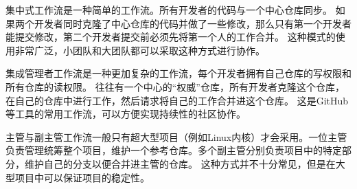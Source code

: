 \documentclass[../main.tex]{subfiles}
\begin{document}
集中式工作流是一种简单的工作流。所有开发者的代码与一个中心仓库同步。
如果两个开发者同时克隆了中心仓库的代码并做了一些修改，那么只有第一个开发者能提交修改，第二个开发者提交前必须先将第一个人的工作合并。
这种模式的使用非常广泛，小团队和大团队都可以采取这种方式进行协作。

集成管理者工作流是一种更加复杂的工作流，每个开发者拥有自己仓库的写权限和所有仓库的读权限。
往往有一个中心的“权威”仓库，所有开发者克隆这个仓库，在自己的仓库中进行工作，然后请求将自己的工作合并进这个仓库。
这是GitHub等工具的常用工作流，可以方便实现持续性的社区协作。

主管与副主管工作流一般只有超大型项目（例如Linux内核）才会采用。一位主管负责管理统筹整个项目，维护一个参考仓库。多个副主管分别负责项目中的特定部分，维护自己的分支以便合并进主管的仓库。
这种方式并不十分常见，但是在大型项目中可以保证项目的稳定性。
\end{document}

